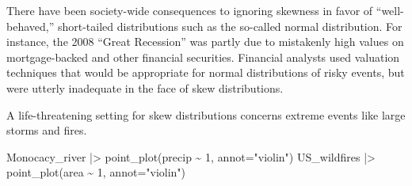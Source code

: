 \documentclass[
  letterpaper,
  DIV=11,
  numbers=noendperiod,
  oneside]{scrartcl}
\newenvironment{Shaded}{\begin{snugshade}}{\end{snugshade}}
\newcommand{\AttributeTok}[1]{\textcolor[rgb]{0.40,0.45,0.13}{#1}}
\newcommand{\DecValTok}[1]{\textcolor[rgb]{0.68,0.00,0.00}{#1}}
\newcommand{\FunctionTok}[1]{\textcolor[rgb]{0.28,0.35,0.67}{#1}}
\newcommand{\NormalTok}[1]{\textcolor[rgb]{0.00,0.23,0.31}{#1}}
\newcommand{\SpecialCharTok}[1]{\textcolor[rgb]{0.37,0.37,0.37}{#1}}
\newcommand{\StringTok}[1]{\textcolor[rgb]{0.13,0.47,0.30}{#1}}
\begin{document}
There have been society-wide consequences to ignoring skewness in favor
of ``well-behaved,'' short-tailed distributions such as the so-called
normal distribution. For instance, the 2008 ``Great Recession'' was
partly due to mistakenly high values on mortgage-backed and other
financial securities. Financial analysts used valuation techniques that
would be appropriate for normal distributions of risky events, but were
utterly inadequate in the face of skew distributions.

\begin{tcolorbox}[enhanced jigsaw, colbacktitle=quarto-callout-note-color!10!white, opacityback=0, breakable, opacitybacktitle=0.6, colback=white, coltitle=black, arc=.35mm, title=\textcolor{quarto-callout-note-color}{\faInfo}\hspace{0.5em}{Example: Skew storms}, left=2mm, colframe=quarto-callout-note-color-frame, rightrule=.15mm, bottomrule=.15mm, leftrule=.75mm, bottomtitle=1mm, toptitle=1mm, titlerule=0mm, toprule=.15mm]

A life-threatening setting for skew distributions concerns extreme
events like large storms and fires.

\begin{Shaded}
\begin{Highlighting}[]
\NormalTok{Monocacy\_river }\SpecialCharTok{|\textgreater{}} 
  \FunctionTok{point\_plot}\NormalTok{(precip }\SpecialCharTok{\textasciitilde{}} \DecValTok{1}\NormalTok{, }\AttributeTok{annot=}\StringTok{"violin"}\NormalTok{)}
\NormalTok{US\_wildfires }\SpecialCharTok{|\textgreater{}} 
  \FunctionTok{point\_plot}\NormalTok{(area }\SpecialCharTok{\textasciitilde{}} \DecValTok{1}\NormalTok{, }\AttributeTok{annot=}\StringTok{"violin"}\NormalTok{)}
\end{Highlighting}
\end{Shaded}

\begin{figure}[H]

\begin{minipage}{0.50\linewidth}

\end{minipage}
\end{figure}
\end{tcolorbox}
\end{document}
